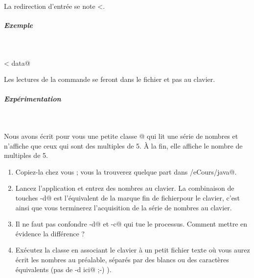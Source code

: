 \documentclass[11pt,a4paper]{article}
\begin{document}
			\begin{boxedminipage}[h]{\linewidth}
		
					La redirection d'entr\'ee se note \guillemotleft <\guillemotright .			
				
			\end{boxedminipage}

			
		\subparagraph{Exemple} 
		
					\textcolor{white}{.} \par
				
            \par
        \verb@commande < data@\par
				
					Les lectures de la commande se feront dans
					le fichier \verb@data@
					et pas au clavier.
				
            \par
        
			
		\subparagraph{Exp\'erimentation} 
		
					\textcolor{white}{.} \par
				
            \par
        
						Nous avons \'ecrit pour vous une petite classe
						@
						qui lit une s\'erie de nombres et n'affiche
						que ceux qui sont des multiples de 5.
						\`A la fin, elle affiche le nombre de multiples de 5.
					
            \par
        
					\begin{enumerate}
				
			\item 
						Copiez-la chez vous ; vous la trouverez
						quelque part dans \verb@/eCours/java@.
					
			\item 
						Lancez l'application et entrez des nombres au clavier.
						La combinaison de touches 
						\verb@Ctrl-d@ est l'\'equivalent 
						de la marque \guillemotleft fin de fichier\guillemotright  pour le clavier,
						c'est ainsi que vous terminerez l'acquisition de la s\'erie 
						de nombres au clavier.
					
			\item 
						Il ne faut pas confondre 
						\verb@Ctrl-d@ 
						et \verb@Ctrl-c@
						qui tue le processus.
						Comment mettre en \'evidence la diff\'erence ?
					
			\item 
						Ex\'ecutez la classe en associant le clavier 
						\`a un petit fichier texte
						o\`u vous aurez \'ecrit les nombres au pr\'ealable,
						s\'epar\'es par des blancs ou des caract\`eres \'equivalents 
						(pas de \verb@Ctrl-d	ici@ ;-) ).						
					
					\end{enumerate}
				
\end{document}
